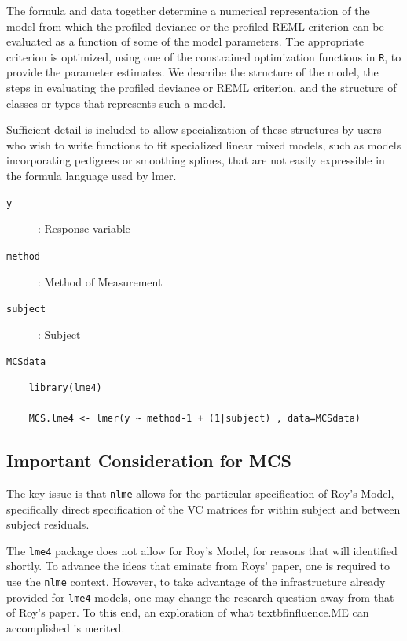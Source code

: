 \documentclass[Main.tex]{subfiles}
\begin{document}
The formula and data together determine a numerical representation of the model from which the profiled deviance or the profiled REML criterion can be evaluated as a function of some of the model parameters. The appropriate criterion is optimized, using one of the constrained optimization functions in \texttt{R}, to provide the parameter estimates. We describe the structure of the model, the steps in evaluating the profiled deviance or REML criterion, and the structure of classes or types that represents such a model. 

Sufficient detail is included to allow specialization of these structures by users who wish to write functions to fit specialized linear mixed models, such as models incorporating pedigrees or smoothing splines, that are not easily expressible in the formula language used by lmer.


\begin{description}
	\item[\texttt{y}] : Response variable
	\item[\texttt{method}] : Method of Measurement
	\item[\texttt{subject}] : Subject
	\item[\texttt{MCSdata}] 
\end{description}
\begin{framed}
	\begin{verbatim}
	library(lme4)
	
	MCS.lme4 <- lmer(y ~ method-1 + (1|subject) , data=MCSdata)
	\end{verbatim}
\end{framed}
\newpage

\subsection{Important Consideration for MCS}

The key issue is that \texttt{nlme} allows for the particular specification of Roy's Model, specifically direct specification of the VC matrices for within subject and between subject residuals.

The \texttt{lme4} package does not allow for Roy's Model, for reasons that will identified shortly.
To advance the ideas that eminate from Roys' paper, one is required to use the \texttt{nlme} context. However, to take advantage of the infrastructure already provided for \texttt{lme4} models, one may change the research question away from that of Roy's paper. 
To this end, an exploration of what textbf{influence.ME} can accomplished is merited.
\end{document}
